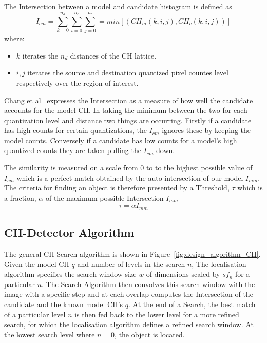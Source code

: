 The Intersection between a model and candidate histogram is defined as
\begin{equation}\label{eqn:intersection}
    I_{cm} = \sum_{k=0}^{n_d}\sum_{i=0}^{n_c}\sum_{j=0}^{n_c} = min[(CH_m(k,i,j),CH_c(k,i,j))]
\end{equation}
where:
\begin{itemize}
    \item $k$ iterates the $n_d$ distances of the CH lattice.
    \item $i,j$ iterates the source and destination quantized pixel countes level respectively over the
        region of interest.
\end{itemize}
Chang et al~\cite{Chang1999} expresses the Intersection as a measure of how well the
candidate accounts for the model CH\@. In taking the minimum between the two
for each quantization level and distance two things are occurring. Firstly if a
candidate has high counts for certain quantizations, the $I_{cm}$ ignores these
by keeping the model counts. Conversely if a candidate has low counts for a
model's high quantized counts they are taken pulling the $I_{cm}$ down.

The similarity is measured on a scale from 0 to to the highest possible value of
$I_{cm}$ which is a perfect match obtained by the auto-intersection of our
model $I_{mm}$.
The criteria for finding an object is therefore presented by a Threshold, $\tau$ which
is a fraction, $\alpha$ of the maximum possible Intersection $I_{mm}$
$$\tau=\alpha I_{mm}$$


\subsection{CH-Detector Algorithm}


The general CH Search algorithm is shown in
Figure~\ref{fig:design_algorithm_CH}. Given the model CH $q$ and number of
levels in the search $n$, The localisation algorithm specifies the search window
size $w$ of dimensions scaled by $sf_n$ for a particular $n$. The Search
Algorithm then convolves this search window with the image with a specific step
and at each overlap computes the Intersection of the candidate and the known
model CH's $q$.  At the end of a Search, the best match of a particular level
$n$ is then fed back to the lower level for a more refined search, for which the
localisation algorithm defines a refined search window. At the lowest search
level where $n=0$, the object is located.


